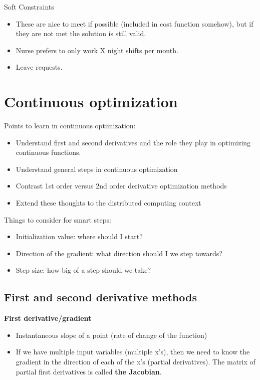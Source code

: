 \documentclass[fontset=fandol,zihao=false,scheme=chinese,heading=true,UTF8]{ctexbook}
\providecommand{\tightlist}{%
  \setlength{\itemsep}{0pt}\setlength{\parskip}{0pt}}
\begin{document}
Soft Constraints

\begin{itemize}
\tightlist
\item
  These are nice to meet if possible (included in cost function somehow), but if they are not met the solution is still valid.
\item
  Nurse prefers to only work X night shifts per month.
\item
  Leave requests.
\end{itemize}

\hypertarget{continuous-optimization}{%
\chapter{Continuous optimization}\label{continuous-optimization}}

Points to learn in continuous optimization:

\begin{itemize}
\tightlist
\item
  Understand first and second derivatives and the role they play in optimizing continuous functions.
\item
  Understand general steps in continuous optimization
\item
  Contrast 1st order versus 2nd order derivative optimization methods
\item
  Extend these thoughts to the distributed computing context
\end{itemize}

Things to consider for smart steps:

\begin{itemize}
\tightlist
\item
  Initialization value: where should I start?
\item
  Direction of the gradient: what direction should I we step towards?
\item
  Step size: how big of a step should we take?
\end{itemize}

\hypertarget{first-and-second-derivative-methods}{%
\section{First and second derivative methods}\label{first-and-second-derivative-methods}}

\textbf{First derivative/gradient}

\begin{itemize}
\tightlist
\item
  Instantaneous slope of a point (rate of change of the function)
\item
  If we have multiple input variables (multiple x's), then we need to know the gradient in the direction of each of the x's (partial derivatives). The matrix of partial first derivatives is called \textbf{the Jacobian}.
\end{itemize}
\end{document}
